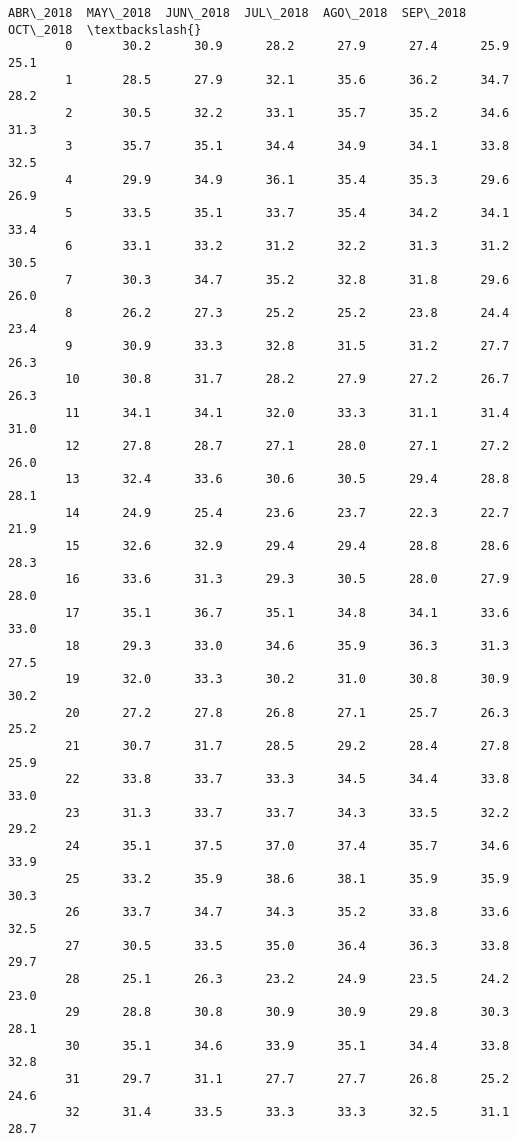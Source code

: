 \documentclass[11pt]{article}
\begin{document}
\begin{Verbatim}[commandchars=\\\{\}]
            ABR\_2018  MAY\_2018  JUN\_2018  JUL\_2018  AGO\_2018  SEP\_2018  OCT\_2018  \textbackslash{}
        0       30.2      30.9      28.2      27.9      27.4      25.9      25.1   
        1       28.5      27.9      32.1      35.6      36.2      34.7      28.2   
        2       30.5      32.2      33.1      35.7      35.2      34.6      31.3   
        3       35.7      35.1      34.4      34.9      34.1      33.8      32.5   
        4       29.9      34.9      36.1      35.4      35.3      29.6      26.9   
        5       33.5      35.1      33.7      35.4      34.2      34.1      33.4   
        6       33.1      33.2      31.2      32.2      31.3      31.2      30.5   
        7       30.3      34.7      35.2      32.8      31.8      29.6      26.0   
        8       26.2      27.3      25.2      25.2      23.8      24.4      23.4   
        9       30.9      33.3      32.8      31.5      31.2      27.7      26.3   
        10      30.8      31.7      28.2      27.9      27.2      26.7      26.3   
        11      34.1      34.1      32.0      33.3      31.1      31.4      31.0   
        12      27.8      28.7      27.1      28.0      27.1      27.2      26.0   
        13      32.4      33.6      30.6      30.5      29.4      28.8      28.1   
        14      24.9      25.4      23.6      23.7      22.3      22.7      21.9   
        15      32.6      32.9      29.4      29.4      28.8      28.6      28.3   
        16      33.6      31.3      29.3      30.5      28.0      27.9      28.0   
        17      35.1      36.7      35.1      34.8      34.1      33.6      33.0   
        18      29.3      33.0      34.6      35.9      36.3      31.3      27.5   
        19      32.0      33.3      30.2      31.0      30.8      30.9      30.2   
        20      27.2      27.8      26.8      27.1      25.7      26.3      25.2   
        21      30.7      31.7      28.5      29.2      28.4      27.8      25.9   
        22      33.8      33.7      33.3      34.5      34.4      33.8      33.0   
        23      31.3      33.7      33.7      34.3      33.5      32.2      29.2   
        24      35.1      37.5      37.0      37.4      35.7      34.6      33.9   
        25      33.2      35.9      38.6      38.1      35.9      35.9      30.3   
        26      33.7      34.7      34.3      35.2      33.8      33.6      32.5   
        27      30.5      33.5      35.0      36.4      36.3      33.8      29.7   
        28      25.1      26.3      23.2      24.9      23.5      24.2      23.0   
        29      28.8      30.8      30.9      30.9      29.8      30.3      28.1   
        30      35.1      34.6      33.9      35.1      34.4      33.8      32.8   
        31      29.7      31.1      27.7      27.7      26.8      25.2      24.6   
        32      31.4      33.5      33.3      33.3      32.5      31.1      28.7   
        

\end{Verbatim}
\end{document}

